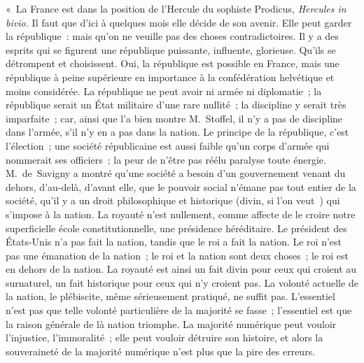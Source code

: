 \documentclass[french,twoside]{book} %
\newenvironment{quoteblock}%
  {\begin{quoting}}
  {\end{quoting}}
\newenvironment{quotebar}{%
    \def\FrameCommand{{\color{rubric!10!}\vrule width 0.5em} \hspace{0.9em}}%
    \def\OuterFrameSep{\itemsep} %
    \MakeFramed {\advance\hsize-\width \FrameRestore}
  }%
  {%
    \endMakeFramed
  }
\renewenvironment{quoteblock}%
  {%
    \savenotes
    \setstretch{0.9}
    \normalfont
    \begin{quotebar}
  }
  {%
    \end{quotebar}
    \spewnotes
  }
\begin{document}
\begin{quoteblock}
 « La France est dans la position de l’Hercule du sophiste Prodicus, {\itshape Hercules in bivio.} Il faut que d’ici à quelques mois elle décide de son avenir. Elle peut garder la république : mais qu’on ne veuille pas des choses contradictoires. Il y a des esprits qui se figurent une république puissante, influente, glorieuse. Qu’ils se détrompent et choisissent. Oui, la république est possible en France, mais une république à peine supérieure en importance à la confédération helvétique et moins considérée. La république ne peut avoir ni armée ni diplomatie ; la république serait un État militaire d’une rare nullité ; la discipline y serait très imparfaite ; car, ainsi que l’a bien montre M. Stoffel, il n’y a pas de discipline dans l’armée, s’il n’y en a pas dans la nation. Le principe de la république, c’est l’élection ; une société républicaine est aussi faible qu’un corps d’armée qui nommerait ses officiers ; la peur de n’être pas réélu paralyse toute énergie. M. de Savigny a montré qu’une société a besoin d’un gouvernement venant du dehors, d’au-delà, d’avant elle, que le pouvoir social n’émane pas tout entier de la société, qu’il y a un droit philosophique et historique (divin, si l’on veut ) qui s’impose à la nation. La royauté n’est nullement, comme affecte de le croire notre superficielle école constitutionnelle, une présidence héréditaire. Le président des États-Unis n’a pas fait la nation, tandis que le roi a fait la nation. Le roi n’est pas une émanation de la nation ; le roi et la nation sont deux choses ; le roi est en dehors de la nation. La royauté est ainsi un fait divin pour ceux qui croient au surnaturel, un fait historique pour ceux qui n’y croient pas. La volonté actuelle de la nation, le plébiscite, même sérieusement pratiqué, ne suffit pas. L’essentiel n’est pas que telle volonté particulière de la majorité se fasse ; l’essentiel est que la raison générale de là nation triomphe. La majorité numérique peut vouloir l’injustice, l’immoralité ; elle peut vouloir détruire son histoire, et alors la souveraineté de la majorité numérique n’est plus que la pire des erreurs.\par

\end{quoteblock}
\end{document}

